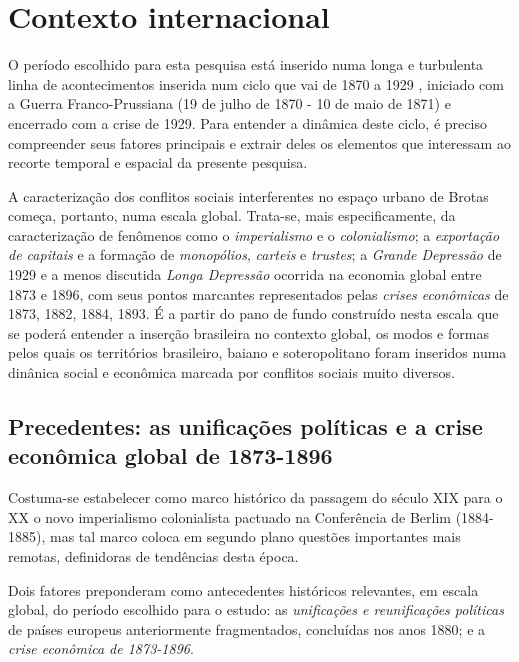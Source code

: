 \section{Contexto internacional}\label{sec:1.1}

O período escolhido para esta pesquisa está inserido numa longa e turbulenta linha de acontecimentos inserida num ciclo que vai de 1870 a 1929 \cite{bernardo_fascismo_2003,bukharin_imperialismo_1986,
hobsbawm_empire_1989,hobsbawm_extremes_1995,hobson_imperialism_1902,
hobson_capitmoderno_1983,KROPOTKIN1901,lenin_imperialismo_1987,luxemburg_acumula_1985,
morris_magnatas_2010}, iniciado com a Guerra Franco-Prussiana (19 de julho de 1870 - 10 de maio de 1871) e encerrado com a crise de 1929. Para entender a dinâmica deste ciclo, é preciso compreender seus fatores principais e extrair deles os elementos que interessam ao recorte temporal e espacial da presente pesquisa.

A caracterização dos conflitos sociais interferentes no espaço urbano de Brotas começa, portanto, numa escala global. Trata-se, mais especificamente, da caracterização de fenômenos como o \textit{imperialismo} e o \textit{colonialismo}; a \textit{exportação de capitais} e a formação de \textit{monopólios}, \textit{carteis} e \textit{trustes}; a \textit{Grande Depressão} de 1929 e a menos discutida \textit{Longa Depressão} ocorrida na economia global entre 1873 e 1896, com seus pontos marcantes representados pelas \textit{crises econômicas} de 1873, 1882, 1884, 1893. É a partir do pano de fundo construído nesta escala que se poderá entender a inserção brasileira no contexto global, os modos e formas pelos quais os territórios brasileiro, baiano e soteropolitano foram inseridos numa dinânica social e econômica marcada por conflitos sociais muito diversos.

\subsection{Precedentes: as unificações políticas e a crise econômica global de 1873-1896}

Costuma-se estabelecer como marco histórico da passagem do século XIX para o XX o novo imperialismo colonialista pactuado na Conferência de Berlim (1884-1885), mas tal marco coloca em segundo plano questões importantes mais remotas, definidoras de tendências desta época.  

Dois fatores preponderam como antecedentes históricos relevantes, em escala global, do período escolhido para o estudo: as \textit{unificações e reunificações políticas} de países europeus anteriormente fragmentados, concluídas nos anos 1880; e a \textit{crise econômica de 1873-1896}.

